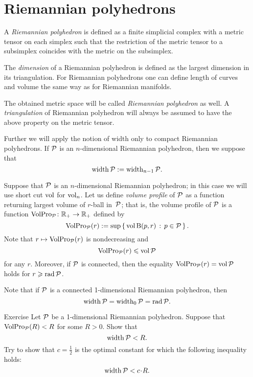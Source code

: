 \section{Riemannian polyhedrons}

A \emph{Riemannian polyhedron} is defined as a finite simplicial complex with a metric tensor on each simplex such that the restriction of the metric tensor to a subsimplex coincides with the metric on the subsimplex.

The {}\emph{dimension} of a Riemannian polyhedron is defined as the largest dimension in its triangulation.
For Riemannian polyhedrons one can define length of curves and volume the same way as for Riemannian manifolds.

The obtained metric space will be called \emph{Riemannian polyhedron} as well.
A \emph{triangulation} of Riemannian polyhedron  will always be assumed to have the above property on the metric tensor.

Further we will apply the notion of width only to compact Riemannian polyhedrons.
If $\mathcal{P}$ is an $n$-dimensional Riemannian polyhedron, then 
we suppose that
\[\operatorname{\rm width}\nolimits\mathcal{P}\mathrel{:=}\operatorname{\rm width}\nolimits_{n-1}\mathcal{P}.\]


Suppose that $\mathcal{P}$ is an $n$-dimensional Riemannian polyhedron;
in this case we will use short cut $\operatorname{\rm vol}\nolimits$ for $\operatorname{\rm vol}\nolimits_n$.
Let us define \emph{volume profile} of $\mathcal{P}$ as a function 
returning largest volume of $r$-ball in~$\mathcal{P}$;
that is, the volume profile of $\mathcal{P}$ is a function $\operatorname{\rm VolPro}\nolimits_{\mathcal{P}}\colon\mathbb{R}_+\to\mathbb{R}_+$ defined by 
\[\operatorname{\rm VolPro}\nolimits_{\mathcal{P}}(r)\mathrel{:=} \sup\left\{\,{\operatorname{\rm vol}\nolimits \mathrm{B}{}(p,r)}\,:\,{p\in\mathcal{P}}\,\right\}.\]
Note that 
$r\mapsto \operatorname{\rm VolPro}\nolimits_{\mathcal{P}}(r)$ is nondecreasing  and
\[\operatorname{\rm VolPro}\nolimits_{\mathcal{P}}(r)\leqslant\operatorname{\rm vol}\nolimits\mathcal{P}\]
for any $r$.
Moreover, if $\mathcal{P}$ is connected, then the equality $\operatorname{\rm VolPro}\nolimits_{\mathcal{P}}(r)=\operatorname{\rm vol}\nolimits\mathcal{P}$ holds
for $r\geqslant \mathop{\rm rad}\nolimits \mathcal{P}$.

Note that if $\mathcal{P}$ is a connected 1-dimensional Riemannian polyhedron, then 
\[\operatorname{\rm width}\nolimits\mathcal{P}=\operatorname{\rm width}\nolimits_0\mathcal{P}=\mathop{\rm rad}\nolimits\mathcal{P}.\]

\begin{thm}{Exercise}\label{ex:1D-case}
Let $\mathcal{P}$ be a 1-dimensional Riemannian polyhedron.
Suppose that $\operatorname{\rm VolPro}\nolimits_{\mathcal{P}}(R)<R$ for some $R>0$.
Show that 
\[\operatorname{\rm width}\nolimits \mathcal{P}<R.\]
Try to show that $c=\tfrac 12$ is the optimal constant for which the following inequality holds: 
\[\width \spc{P}<c\cdot R.\]
\end{thm}

